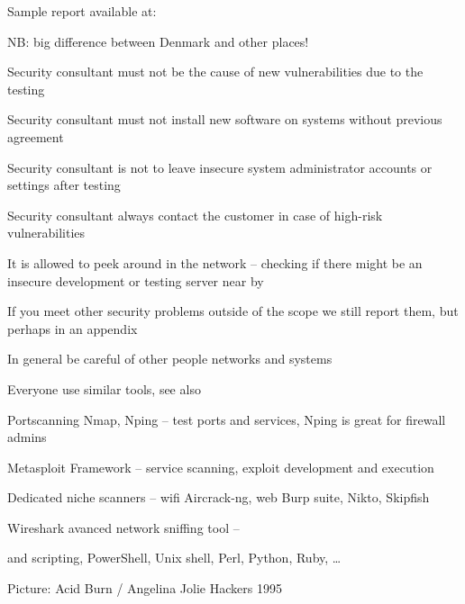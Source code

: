 \documentclass[Screen16to9,17pt]{foils}
\begin{document}
Sample report available at: 


\begin{list2}
\item NB: big difference between Denmark and other places!
\item Security consultant must not be the cause of new vulnerabilities due to the testing
\item Security consultant must not install new software on systems without previous agreement
\item Security consultant is not to leave insecure system administrator accounts or settings after testing
\item Security consultant always contact the customer in case of high-risk vulnerabilities
\item It is allowed to peek around in the network -- checking if there might be an insecure development or testing server near by
\item If you meet other security problems outside of the scope we still report them, but perhaps in an appendix
\end{list2}

\centerline{In general be careful of other people networks and systems}





\begin{list2}
\item Everyone use similar tools, see also 
\item Portscanning Nmap, Nping -- test ports and services, Nping is great for firewall admins 
\item Metasploit Framework -- service scanning, exploit development and execution 
\item Dedicated niche scanners -- wifi Aircrack-ng, web Burp suite, Nikto, Skipfish 
\item Wireshark avanced network sniffing tool -- 
\item and scripting, PowerShell, Unix shell, Perl, Python, Ruby, \ldots
\end{list2}

Picture: Acid Burn / Angelina Jolie Hackers 1995
\end{document}
